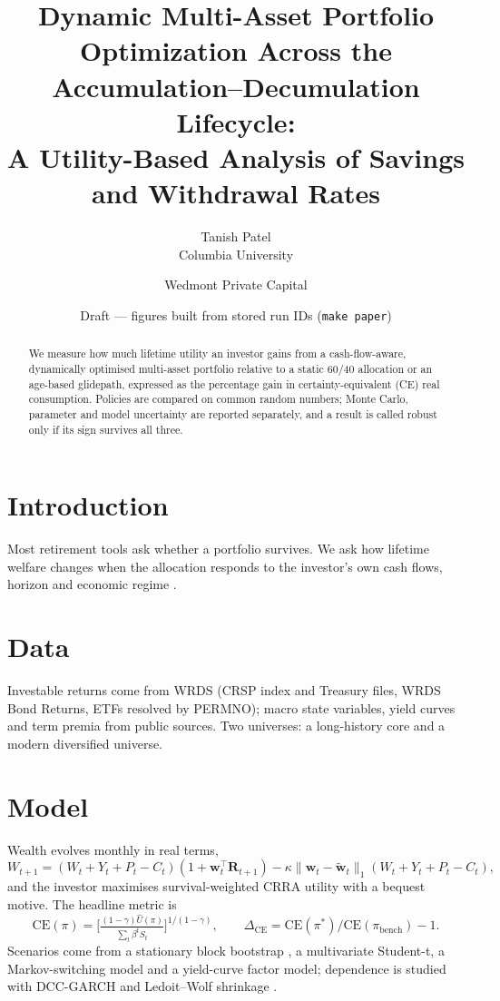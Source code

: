\documentclass[11pt]{article}
\title{Dynamic Multi-Asset Portfolio Optimization Across the Accumulation--Decumulation Lifecycle:\\
A Utility-Based Analysis of Savings and Withdrawal Rates}
\author{Tanish Patel\\Columbia University \and Wedmont Private Capital}
\date{Draft --- figures built from stored run IDs (\texttt{make paper})}
\begin{document}
\maketitle

\begin{abstract}
We measure how much lifetime utility an investor gains from a cash-flow-aware, dynamically optimised multi-asset
portfolio relative to a static 60/40 allocation or an age-based glidepath, expressed as the percentage gain in
certainty-equivalent (CE) real consumption. Policies are compared on common random numbers; Monte Carlo, parameter
and model uncertainty are reported separately, and a result is called robust only if its sign survives all three.
\end{abstract}

\section{Introduction}
Most retirement tools ask whether a portfolio survives. We ask how lifetime welfare changes when the allocation
responds to the investor's own cash flows, horizon and economic regime \citep{merton1969lifetime,cocco2005consumption}.

\section{Data}
Investable returns come from WRDS (CRSP index and Treasury files, WRDS Bond Returns, ETFs resolved by PERMNO);
macro state variables, yield curves \citep{gurkaynak2007us,gurkaynak2010tips} and term premia \citep{adrian2013pricing}
from public sources. Two universes: a long-history core and a modern diversified universe.

\section{Model}
Wealth evolves monthly in real terms,
\begin{equation}
W_{t+1}=(W_t+Y_t+P_t-C_t)(1+\mathbf w_t^\top\mathbf R_{t+1})-\kappa\lVert\mathbf w_t-\tilde{\mathbf w}_t\rVert_1(W_t+Y_t+P_t-C_t),
\end{equation}
and the investor maximises survival-weighted CRRA utility with a bequest motive. The headline metric is
\begin{equation}
\mathrm{CE}(\pi)=\Big[\tfrac{(1-\gamma)\hat U(\pi)}{\sum_t\beta^tS_t}\Big]^{1/(1-\gamma)},\qquad
\Delta_{\mathrm{CE}}=\mathrm{CE}(\pi^*)/\mathrm{CE}(\pi_{\mathrm{bench}})-1.
\end{equation}
Scenarios come from a stationary block bootstrap \citep{politis1994stationary,politis2004automatic}, a multivariate
Student-t, a Markov-switching model \citep{hamilton1989new} and a yield-curve factor model; dependence is studied with
DCC-GARCH \citep{engle2002dynamic} and Ledoit--Wolf shrinkage \citep{ledoit2004well}.
\end{document}

